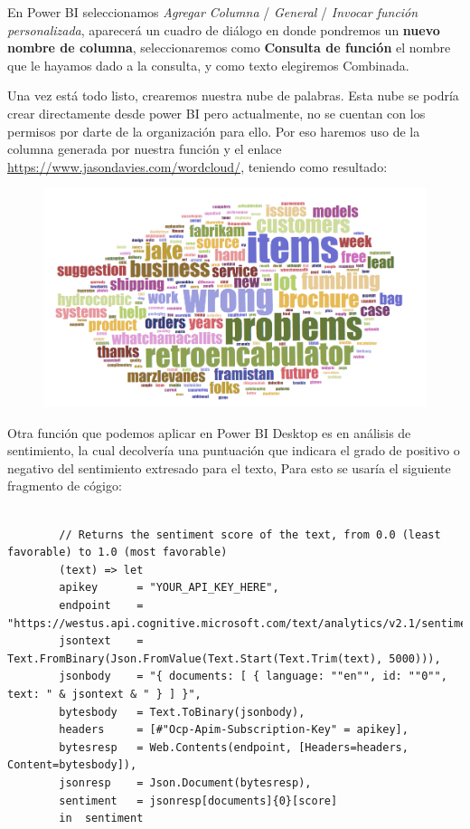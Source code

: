 \documentclass[english,runningheads,a4paper]{llncs}[2018/03/10]
\begin{document}
    En Power BI seleccionamos \textit{Agregar Columna} / \textit{General} / 
    \textit{Invocar función personalizada}, aparecerá un cuadro de diálogo en 
    donde pondremos un \textbf{nuevo nombre de columna}, seleccionaremos como 
    \textbf{Consulta de función} el nombre que le hayamos dado a la consulta, y 
    como texto elegiremos Combinada.
    
    Una vez está todo listo, crearemos nuestra nube de palabras. Esta nube se 
    podría crear directamente desde power BI pero actualmente, no se cuentan 
    con los permisos por darte de la organización para ello. Por eso haremos 
    uso de la columna generada por nuestra función y el enlace 
    \url{https://www.jasondavies.com/wordcloud/}, teniendo como resultado: 
    
    \begin{figure}[H]
        \centering
        \includegraphics[scale=0.5]{./IA/AZURE/wordcloud.png}
    \end{figure}
    Otra función que podemos aplicar en Power BI Desktop es en análisis de 
    sentimiento, la cual decolvería una puntuación que indicara el grado de 
    positivo o negativo del sentimiento extresado para el texto, Para esto se 
    usaría el siguiente fragmento de cógigo:
    
    \small{
        \begin{verbatim}
        
        // Returns the sentiment score of the text, from 0.0 (least favorable) to 1.0 (most favorable)
        (text) => let
        apikey      = "YOUR_API_KEY_HERE",
        endpoint    = "https://westus.api.cognitive.microsoft.com/text/analytics/v2.1/sentiment",
        jsontext    = Text.FromBinary(Json.FromValue(Text.Start(Text.Trim(text), 5000))),
        jsonbody    = "{ documents: [ { language: ""en"", id: ""0"", text: " & jsontext & " } ] }",
        bytesbody   = Text.ToBinary(jsonbody),
        headers     = [#"Ocp-Apim-Subscription-Key" = apikey],
        bytesresp   = Web.Contents(endpoint, [Headers=headers, Content=bytesbody]),
        jsonresp    = Json.Document(bytesresp),
        sentiment   = jsonresp[documents]{0}[score]
        in  sentiment
        \end{verbatim}
    }
\end{document}
